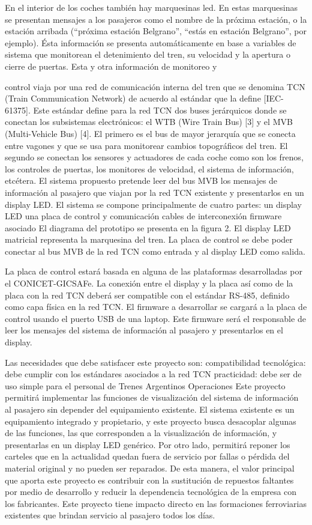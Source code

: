 En el interior de los coches también hay marquesinas led. En estas marquesinas se presentan
mensajes a los pasajeros como el nombre de la próxima estación, o la estación arribada
(“próxima estación Belgrano”, “estás en estación Belgrano”, por ejemplo). Ésta información se
presenta automáticamente en base a variables de sistema que monitorean el detenimiento del
tren, su velocidad y la apertura o cierre de puertas. Esta y otra información de monitoreo y

control viaja por una red de comunicación interna del tren que se denomina TCN (Train
Communication Network) de acuerdo al estándar que la define [IEC-61375]. Este estándar define
para la red TCN dos buses jerárquicos donde se conectan los subsistemas electrónicos: el WTB
(Wire Train Bus) [3] y el MVB (Multi-Vehicle Bus) [4]. El primero es el bus de mayor jerarquía que
se conecta entre vagones y que se usa para monitorear cambios topográficos del tren. El
segundo se conectan los sensores y actuadores de cada coche como son los frenos, los
controles de puertas, los monitores de velocidad, el sistema de información, etcétera.
El sistema propuesto pretende leer del bus MVB los mensajes de información al pasajero que
viajan por la red TCN existente y presentarlos en un display LED. El sistema se compone
principalmente de cuatro partes:
un display LED
una placa de control y comunicación
cables de interconexión
firmware asociado
El diagrama del prototipo se presenta en la figura 2. El display LED matricial representa la
marquesina del tren. La placa de control se debe poder conectar al bus MVB de la red TCN
como entrada y al display LED como salida.


La placa de control estará basada en alguna de las plataformas desarrolladas por el
CONICET-GICSAFe. La conexión entre el display y la placa así como de la placa con la red TCN
deberá ser compatible con el estándar RS-485, definido como capa física en la red TCN. El
firmware a desarrollar se cargará a la placa de control usando el puerto USB de una laptop. Este
firmware será el responsable de leer los mensajes del sistema de información al pasajero y
presentarlos en el display.


Las necesidades que debe satisfacer este proyecto son:
compatibilidad tecnológica: debe cumplir con los estándares asociados a la red TCN
practicidad: debe ser de uso simple para el personal de Trenes Argentinos Operaciones
Este proyecto permitirá implementar las funciones de visualización del sistema de información al
pasajero sin depender del equipamiento existente. El sistema existente es un equipamiento
integrado y propietario, y este proyecto busca desacoplar algunas de las funciones, las que
corresponden a la visualización de información, y presentarlas en un display LED genérico. Por
otro lado, permitirá reponer los carteles que en la actualidad quedan fuera de servicio por fallas o
pérdida del material original y no pueden ser reparados. De esta manera, el valor principal que
aporta este proyecto es contribuir con la sustitución de repuestos faltantes por medio de
desarrollo y reducir la dependencia tecnológica de la empresa con los fabricantes. Este proyecto
tiene impacto directo en las formaciones ferroviarias existentes que brindan servicio al pasajero
todos los días.


